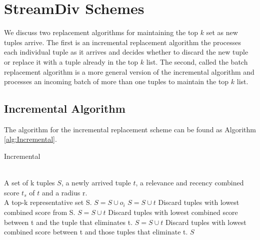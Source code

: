 \section{StreamDiv Schemes}
We discuss two replacement algorithms for maintaining the top $k$ set as new tuples arrive. The first is an incremental replacement algorithm the processes each individual tuple as it arrives and decides whether to discard the new tuple or replace it with a tuple already in the top $k$ list. The second, called the batch replacement algorithm is a more general version of the incremental algorithm and processes an incoming batch of more than one tuples to maintain the top $k$ list.

\subsection{Incremental Algorithm}
	The algorithm for the incremental replacement scheme can be found as Algorithm \ref{alg:Incremental}.
	\begin{algorithm}
		\caption{Incremental}
		\label{alg:Incremental}
		\begin{algorithmic}[1]
			\REQUIRE ~~\\
			A set of k tuples $S$, a newly arrived tuple $t$, a relevance and recency combined score $t_s$ of $t$ and a radius r.
			\ENSURE ~~\\
			A top-k representative set S.
				\STATE $S = S \cup {o_i}$
			\ELSE
					\STATE $S = S \cup{t}$
					\STATE Discard tuples with lowest combined score from S.
				\ENDIF
					\STATE $S = S \cup{t}$
					\STATE Discard tuples with lowest combined score between t and the tuple that eliminates t.
				\ENDIF
					\STATE $S = S \cup{t}$
					\STATE Discard tuples with lowest combined score between t and those tuples that eliminate t.
				\ENDIF
			\ENDIF
			 $S$
		\end{algorithmic}
	\end{algorithm}

\newcommand{\algorithmicbreak}{\textbf{break}}
\newcommand{\BREAK}{\STATE \algorithmicbreak}

